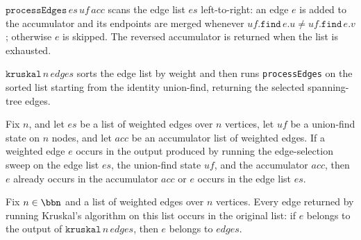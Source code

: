 \begin{definition}
\label{Kruskal.processEdges}
\leanok
{}
$\mathtt{processEdges}\,\mathit{es}\,\mathit{uf}\,\mathit{acc}$ scans the
edge list $\mathit{es}$ left-to-right: an edge $e$ is added to the
accumulator and its endpoints are merged whenever
$\mathit{uf}.\mathtt{find}\,e.u \ne \mathit{uf}.\mathtt{find}\,e.v$;
otherwise $e$ is skipped.  The reversed accumulator is returned when the
list is exhausted.
\end{definition}

\begin{definition}
\label{Kruskal.kruskal}
\leanok
{}
$\mathtt{kruskal}\,n\,\mathit{edges}$ sorts the edge list by weight and then
runs \texttt{processEdges} on the sorted list starting from the identity
union-find, returning the selected spanning-tree edges.
\end{definition}

\begin{lemma}
\label{Kruskal.processEdges_mem}
\leanok
{}
Fix $n$, and let $\mathit{es}$ be a list of weighted edges over $n$ vertices, let
$\mathit{uf}$ be a union-find state on $n$ nodes, and let $\mathit{acc}$ be an
accumulator list of weighted edges. If a weighted edge $e$ occurs in the output produced
by running the edge-selection sweep on the edge list $\mathit{es}$, the union-find state
$\mathit{uf}$, and the accumulator $\mathit{acc}$, then $e$ already occurs in the
accumulator $\mathit{acc}$ or $e$ occurs in the edge list $\mathit{es}$.
\end{lemma}

\begin{lemma}
\label{Kruskal.kruskal_subset}
\leanok
{}
Fix $n \in \bbn$ and a list of weighted edges over $n$ vertices. Every edge returned by
running Kruskal's algorithm on this list occurs in the original list: if $e$ belongs to
the output of $\mathtt{kruskal}\,n\,\mathit{edges}$, then $e$ belongs to
$\mathit{edges}$.
\end{lemma}
